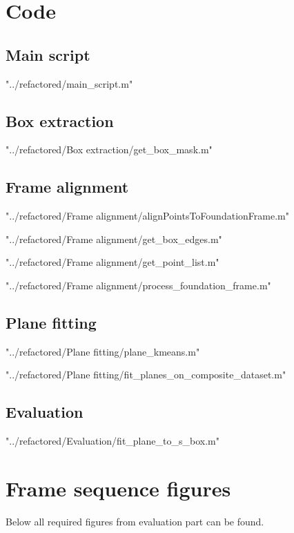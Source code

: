 \documentclass[12pt,a4paper,onecolumn]{article}
\begin{document}
\appendix


\newpage



\newpage


\section{Code}
\label{apen:code_in}
\subsection{Main script}

{"../refactored/main_script.m"}

\subsection{Box extraction}

{"../refactored/Box extraction/get_box_mask.m"}

\subsection{Frame alignment}

{"../refactored/Frame alignment/alignPointsToFoundationFrame.m"}

{"../refactored/Frame alignment/get_box_edges.m"}

{"../refactored/Frame alignment/get_point_list.m"}

{"../refactored/Frame alignment/process_foundation_frame.m"}

\subsection{Plane fitting}

{"../refactored/Plane fitting/plane_kmeans.m"}

{"../refactored/Plane fitting/fit_planes_on_composite_dataset.m"}

\subsection{Evaluation}

{"../refactored/Evaluation/fit_plane_to_s_box.m"}


\section{Frame sequence figures}
Below all required figures from evaluation part can be found.
\end{document}
